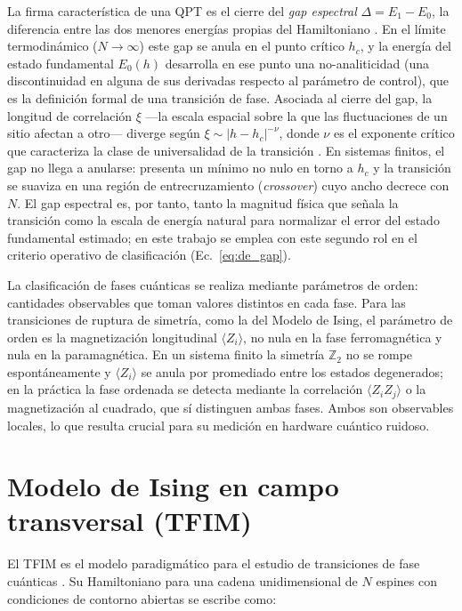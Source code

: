 \documentclass[11pt,a4paper,spanish]{book}
\begin{document}
La firma característica de una QPT es el cierre del \emph{gap espectral} $\Delta = E_1 - E_0$, la diferencia entre las dos menores energías propias del Hamiltoniano \citep{sachdev2011}. En el límite termodinámico ($N \to \infty$) este gap se anula en el punto crítico $h_c$, y la energía del estado fundamental $E_0(h)$ desarrolla en ese punto una no-analiticidad (una discontinuidad en alguna de sus derivadas respecto al parámetro de control), que es la definición formal de una transición de fase. Asociada al cierre del gap, la longitud de correlación $\xi$ ---la escala espacial sobre la que las fluctuaciones de un sitio afectan a otro--- diverge según $\xi \sim |h - h_c|^{-\nu}$, donde $\nu$ es el exponente crítico que caracteriza la clase de universalidad de la transición \citep{dutta2015, sachdev2011}. En sistemas finitos, el gap no llega a anularse: presenta un mínimo no nulo en torno a $h_c$ y la transición se suaviza en una región de entrecruzamiento (\emph{crossover}) cuyo ancho decrece con $N$. El gap espectral es, por tanto, tanto la magnitud física que señala la transición como la escala de energía natural para normalizar el error del estado fundamental estimado; en este trabajo se emplea con este segundo rol en el criterio operativo de clasificación (Ec.~\ref{eq:de_gap}).

La clasificación de fases cuánticas se realiza mediante parámetros de orden: cantidades observables que toman valores distintos en cada fase. Para las transiciones de ruptura de simetría, como la del Modelo de Ising, el parámetro de orden es la magnetización longitudinal $\langle Z_i \rangle$, no nula en la fase ferromagnética y nula en la paramagnética. En un sistema finito la simetría $\mathbb{Z}_2$ no se rompe espontáneamente y $\langle Z_i \rangle$ se anula por promediado entre los estados degenerados; en la práctica la fase ordenada se detecta mediante la correlación $\langle Z_i Z_j \rangle$ o la magnetización al cuadrado, que sí distinguen ambas fases. Ambos son observables locales, lo que resulta crucial para su medición en hardware cuántico ruidoso.

\section{Modelo de Ising en campo transversal (TFIM)}

El TFIM es el modelo paradigmático para el estudio de transiciones de fase cuánticas \citep{dutta2015}. Su Hamiltoniano para una cadena unidimensional de $N$ espines con condiciones de contorno abiertas se escribe como:
\end{document}
